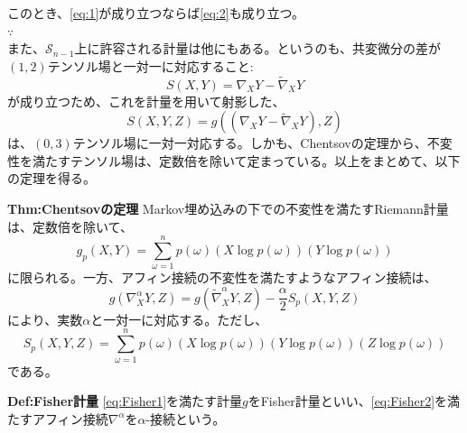 \documentclass[a4paper,11pt]{jsarticle}
\numberwithin{equation}{section}
\begin{document}
このとき、\ref{eq:1}が成り立つならば\ref{eq:2}も成り立つ。\\
$\because$\\

また、$\mathcal{S}_{n-1}$上に許容される計量は他にもある。というのも、共変微分の差が$(1,2)$テンソル場と一対一に対応すること:
\begin{equation}
    S(X,Y) = \nabla_X Y - \tilde{\nabla}_X Y
\end{equation}
が成り立つため、これを計量を用いて射影した、
\begin{equation}
    S(X,Y,Z) = g((\nabla_X Y - \tilde{\nabla}_X Y),Z)
\end{equation}
は、$(0,3)$テンソル場に一対一対応する。しかも、Chentsovの定理から、不変性を満たすテンソル場は、定数倍を除いて定まっている。以上をまとめて、以下の定理を得る。\\

\begin{itembox}[l]{\textbf{Thm:Chentsovの定理}}
    Markov埋め込みの下での不変性を満たすRiemann計量は、定数倍を除いて、
    \begin{equation}
        \label{eq:Fisher1}
        g_p(X,Y) = \sum_{\omega = 1}^{n} p(\omega) (X\log p(\omega))(Y\log p(\omega))
    \end{equation}
    に限られる。一方、アフィン接続の不変性を満たすようなアフィン接続は、
    \begin{equation}    
        \label{eq:Fisher2}
        g(\nabla_X^{\alpha} Y,Z) = g(\tilde{\nabla}_X^{\alpha} Y,Z) - \frac{\alpha}{2} S_p(X,Y,Z)
    \end{equation}
    により、実数$\alpha$と一対一に対応する。ただし、
    \begin{equation}
        S_p(X,Y,Z) = \sum_{\omega = 1}^{n} p(\omega) (X\log p(\omega))(Y\log p(\omega))(Z\log p(\omega))
    \end{equation}
    である。
\end{itembox}

\begin{itembox}[l]{\textbf{Def:Fisher計量}}
    \ref{eq:Fisher1}を満たす計量$g$をFisher計量といい、\ref{eq:Fisher2}を満たすアフィン接続$\nabla^{\alpha}$を$\alpha$-接続という。

\end{itembox}
\end{document}
